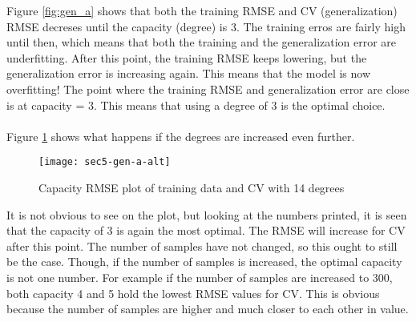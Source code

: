 \documentclass{article}
\begin{document}
Figure \ref{fig:gen_a} shows that both the training RMSE and CV (generalization) RMSE decreses until the capacity (degree) is 3. The training erros are fairly high until then, which means that both the training and the generalization error are underfitting. After this point, the training RMSE keeps lowering, but the generalization error is increasing again. This means that the model is now overfitting! The point where the training RMSE and generalization error are close is at capacity = 3. This means that using a degree of 3 is the optimal choice. 
\\ \\
Figure \ref{fig:gen_a_alt} shows what happens if the degrees are increased even further.

\begin{figure}[H]
  \centering
    \texttt{[image: sec5-gen-a-alt]}
    \caption{Capacity RMSE plot of training data and CV with 14 degrees}
    \label{fig:gen_a_alt}
\end{figure}

It is not obvious to see on the plot, but looking at the numbers printed, it is seen that the capacity of 3 is again the most optimal. The RMSE will increase for CV after this point. The number of samples have not changed, so this ought to still be the case. Though, if the number of samples is increased, the optimal capacity is not one number. For example if the number of samples are increased to 300, both capacity 4 and 5 hold the lowest RMSE values for CV. This is obvious because the number of samples are higher and much closer to each other in value.
\end{document}
